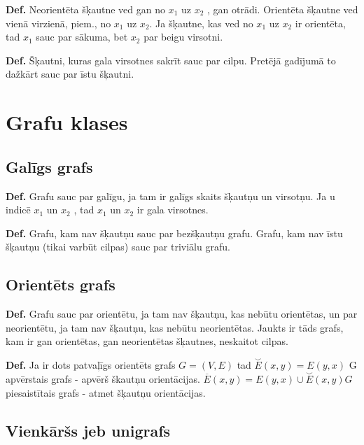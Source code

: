 \documentclass{article}
\begin{document}
\textbf{Def.} Neorientēta šķautne ved gan no $x_1$ uz $x_2$ , gan otrādi. Orientēta šķautne ved vienā virzienā, piem., no $x_1$ uz $x_2$. Ja šķautne, kas ved no $x_1$ uz $x_2$ ir orientēta, tad $x_1$ sauc par sākuma, bet $x_2$ par beigu virsotni. 

\textbf{Def.} Šķautni, kuras gala virsotnes sakrīt sauc par cilpu. Pretējā gadījumā to dažkārt sauc par īstu šķautni.

\section{Grafu klases}

\subsection{Galīgs grafs}

\textbf{Def.}  Grafu sauc par galīgu, ja tam ir galīgs skaits šķautņu un virsotņu. Ja u indicē $x_1$ un $x_2$ , tad $x_1$ un $x_2$ ir gala virsotnes.


\textbf{Def.} Grafu, kam nav šķautņu sauc par bezšķautņu grafu. Grafu, kam nav īstu šķautņu (tikai varbūt cilpas) sauc par triviālu grafu.


\subsection{Orientēts grafs}

\textbf{Def.} Grafu sauc par orientētu, ja tam nav šķautņu, kas nebūtu orientētas, un par neorientētu, ja tam nav šķautņu, kas nebūtu neorientētas.  Jaukts ir tāds grafs, kam ir gan orientētas, gan neorientētas šķautnes, neskaitot cilpas.

\textbf{Def.} Ja ir dots patvaļīgs orientēts grafs $G=(V,E)$ tad $\overset{\smallsmile}{E}(x, y ) = E (y , x )$ G apvērstais grafs - apvērš škautņu orientācijas. $\overline{E} (x, y ) = E (y , x)\cup \overset{\smallsmile}{E} (x, y ) G$ piesaistītais grafs - atmet šķautņu orientācijas. 


\subsection{Vienkāršs jeb unigrafs}
\end{document}
